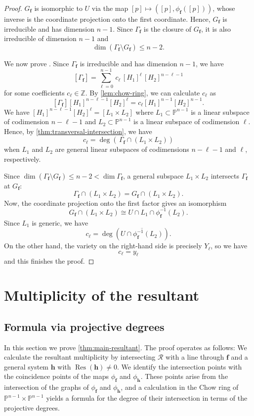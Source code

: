 \documentclass[11pt,letterpaper]{article}
\numberwithin{equation}{section}
\newcommand{\PP}{\mathbb{P}}
\newcommand{\ZZ}{\mathbb{Z}}
\newcommand{\cR}{\mathcal{R}}
\newcommand{\ff}{\ensuremath{\boldsymbol{f}}}
\newcommand{\hh}{\ensuremath{\boldsymbol{h}}}
\DeclareMathOperator{\Res}{Res}
\begin{document}
\begin{proof}
$G_{\ff}$ is isomorphic to $U$ via the map $[p]\mapsto ([p],\phi_{\ff}([p]))$, whose inverse is the coordinate projection onto the first coordinate.
Hence, $G_{\ff}$ is irreducible and has dimension $n-1$.
Since $\Gamma_{\ff}$ is the closure of $G_{\ff}$, it is also irreducible of dimension $n-1$ and \[
    \dim (\Gamma_{\ff}\setminus G_{\ff})\leq n-2.
    \]

    We now prove .
    Since $\Gamma_{\ff}$ is irreducible and has dimension $n-1$, we have \[
    [\Gamma_{\ff}] = \sum_{\ell=0}^{n-1} \, c_\ell \, [H_1]^{\ell}\, [H_2]^{n-\ell-1}
    \] for some coefficients $c_\ell\in\ZZ$.
    By \cref{lem:chow-ring}, we can calculate $c_\ell$ as \[
    [\Gamma_{\ff}][H_1]^{n-\ell-1}[H_2]^\ell = c_\ell [H_1]^{n-1} [H_2]^{n-1}.
    \]
    We have $[H_1]^{n-\ell-1}[H_2]^{\ell}=[L_1\times L_2]$ where $L_1\subset\PP^{n-1}$ is a linear subspace of codimension $n-\ell-1$ and $L_2\subset\PP^{n-1}$ is a linear subspace of codimension $\ell$.
    Hence, by \cref{thm:transversal-intersection}, we have \[
    c_\ell = \deg\left(\, \Gamma_{\ff} \cap (L_1\times L_2)\right)
    \] when $L_1$ and $L_2$ are general linear subspaces of codimensions $n-\ell-1$ and $\ell$, respectively.

   Since $\dim (\Gamma_{\ff}\setminus G_{\ff})\leq n-2<\dim\Gamma_{\ff}$, a general subspace $L_1\times L_2$ intersects $\Gamma_{\ff}$ at $G_{\ff}$:\[
   \Gamma_{\ff}\cap (L_1\times L_2) = G_{\ff}\cap (L_1\times L_2).
   \]
   Now, the coordinate projection onto the first factor gives an isomorphism \[
   G_{\ff}\cap (L_1\times L_2) \cong U\cap L_1 \cap \phi_{\ff}^{-1}(L_2).
   \]
   Since $L_1$ is generic, we have \[
   c_\ell = \deg\left(\overline{U\cap \phi_{\ff}^{-1}(L_2)}\right).
   \]
   On the other hand, the variety on the right-hand side is precisely $Y_\ell$, so we have \[
   c_\ell=y_\ell
   \] and this finishes the proof.
\end{proof}

\section{Multiplicity of the resultant}
\label{sec:main}

\subsection{Formula via projective degrees}

In this section we prove \cref{thm:main-resultant}.
The proof operates as follows:
We calculate the resultant multiplicity by intersecting $\cR$ with a line through $\ff$ and a general system $\hh$ with $\Res(\hh)\neq 0$.
We identify the intersection points with the coincidence points of the maps $\phi_{\ff}$ and $\phi_{\hh}$.
These points arise from the intersection of the graphs of $\phi_{\ff}$ and $\phi_{\hh}$, and a calculation in the Chow ring of $\PP^{n-1}\times\PP^{n-1}$ yields a formula for the degree of their intersection in terms of the projective degrees.
\end{document}
